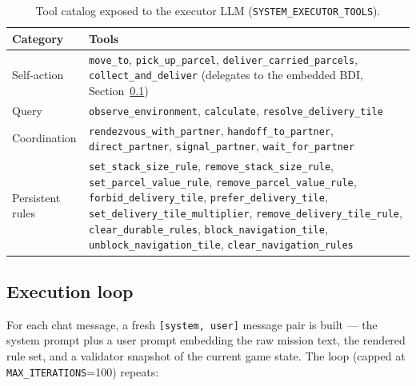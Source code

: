\documentclass[11pt,a4paper]{article}
\begin{document}
\begin{table}[htbp]
\centering
\footnotesize
\begin{tabular}{@{}p{3.0cm}p{9.0cm}@{}}
\toprule
\textbf{Category} & \textbf{Tools} \\
\midrule
Self-action & \texttt{move\_to}, \texttt{pick\_up\_parcel}, \texttt{deliver\_carried\_parcels}, \texttt{collect\_and\_deliver} (delegates to the embedded BDI, Section~\ref{sec:llm-exec-loop}) \\
Query & \texttt{observe\_environment}, \texttt{calculate}, \texttt{resolve\_delivery\_tile} \\
Coordination & \texttt{rendezvous\_with\_partner}, \texttt{handoff\_to\_partner}, \texttt{direct\_partner}, \texttt{signal\_partner}, \texttt{wait\_for\_partner} \\
Persistent rules & \texttt{set\_stack\_size\_rule}, \texttt{remove\_stack\_size\_rule}, \texttt{set\_parcel\_value\_rule}, \texttt{remove\_parcel\_value\_rule}, \texttt{forbid\_delivery\_tile}, \texttt{prefer\_delivery\_tile}, \texttt{set\_delivery\_tile\_multiplier}, \texttt{remove\_delivery\_tile\_rule}, \texttt{clear\_durable\_rules}, \texttt{block\_navigation\_tile}, \texttt{unblock\_navigation\_tile}, \texttt{clear\_navigation\_rules} \\
\bottomrule
\end{tabular}
\caption{Tool catalog exposed to the executor LLM (\texttt{SYSTEM\_EXECUTOR\_TOOLS}).}
\label{tab:tools}
\end{table}

\subsection{Execution loop}
\label{sec:llm-exec-loop}

For each chat message, a fresh \texttt{[system, user]} message pair is built --- the system
prompt plus a user prompt embedding the raw mission text, the rendered rule set, and a validator
snapshot of the current game state. The loop (capped at \texttt{MAX\_ITERATIONS}=100) repeats:
\end{document}
